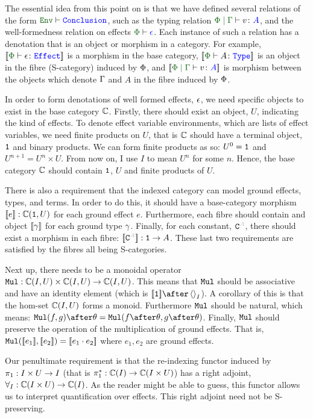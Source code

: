 \documentclass{Report}
\begin{document}
The essential idea from this point on is that we have defined several relations of the form $\wellformed{\texttt{Env}}{\texttt{Conclusion}}$, such as the typing relation $\gpetyperelation{v}{A}$, and the well-formedness relation on effects $\wellformed{\P}{\e}$. Each instance of such a relation has a denotation that is an object or morphism in a category. For example, $\deno{\typerelation{\P}{\e}{\effect}}$ is a morphism in the base category, $\deno{\typerelation{\P}{A}{\type}}$ is an object in the fibre (S-category) induced by $\P$, and $\deno{\gpetyperelation{v}{A}}$ is morphism between the objects which denote $\G$ and $A$ in the fibre induced by $\P$.

In order to form denotations of well formed effects, $\e$, we need specific objects to exist in the base category $\C$. Firstly, there should exist an object, $U$, indicating the kind of effects. To denote effect variable environments, which are lists of effect variables, we need finite products on $U$, that is $\C$ should have a terminal object, $\1$ and binary products. We can form finite products as so: $U^0 = \1$ and $U^{n+1} = U^n\times U$. From now on, I use $I$ to mean $U^n$ for some $n$. Hence, the base category $\C$ should contain $\1$, $U$ and finite products of $U$.

There is also a requirement that the indexed category can model ground effects, types, and terms. In order to do this, it should have a base-category morphism $\deno{e}: \C(\1, U)$ for each ground effect $e$. Furthermore, each fibre should contain and object $\deno{\g}$ for each ground type $\g$. Finally, for each constant, $\const{A}$, there should exist a morphism in each fibre: $\deno{\const{A}}: \1 \rightarrow A$. These last two requirements are satisfied by the fibres all being S-categories.

Next up, there needs to be a monoidal operator $\Mul: \ciu \times \ciu \rightarrow \ciu$. This means that $\Mul$ should be associative and have an identity element (which is $\deno{\1}\after\term{I}$). A corollary of this is that the hom-set $\C(I, U)$ forms a monoid. Furthermore $\Mul$ should be natural, which means: $\Mul(f, g)\after\theta = \Mul(f\after\theta, g\after\theta)$. Finally, $\Mul$ should preserve the operation of the multiplication of ground effects. That is, $\Mul(\deno{e_1},\deno{e_2}) = \deno{e_1\dot e_2}$ where $e_1, e_2$ are ground effects.

Our penultimate requirement is that the re-indexing functor  induced by $\p: I\times U\rightarrow I$ (that is $\pstar: \C(I) \rightarrow \C(I\times U)$) has a right adjoint, $\allI: \C(I\times U) \rightarrow \C(I)$. As the reader might be able to guess, this functor allows us to interpret quantification over effects. This right adjoint need not be S-preserving.
\end{document}

